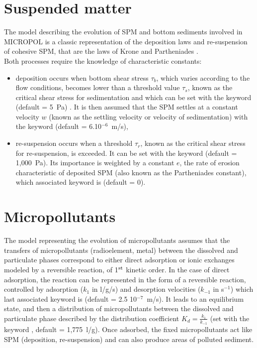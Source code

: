 \section{Suspended matter}

The model describing the evolution of SPM and bottom sediments involved in MICROPOL
is a classic representation of the deposition laws and re-suspension
of cohesive SPM, that are the laws of Krone \cite{krone_flume_1962}
and Partheniades \cite{partheniades_erosion_deposition_1965}.\\

Both processes require the knowledge of characteristic constants:

\begin{itemize}
\item deposition occurs when bottom shear stress $\tau_b$,
  which varies according to the flow conditions, becomes lower than a threshold value $\tau_s$,
  known as the critical shear stress for sedimentation
  and which can be set with the keyword 
  (default = 5~Pa) .
  It is then assumed that the SPM settles at a constant velocity $w$
  (known as the settling velocity or velocity of sedimentation)
  with the keyword 
  (default = 6.10$^{-6}$~m/s),
\item re-suspension occurs when a threshold $\tau_r$,
  known as the critical shear stress for re-suspension, is exceeded.
  It can be set with the keyword 
  (default = 1,000~Pa).
  Its importance is weighted by a constant $e$, the rate of erosion characteristic
  of deposited SPM (also known as the Partheniades constant),
  which associated keyword is  (default = 0).
\end{itemize}

\section{Micropollutants}

The model representing the evolution of micropollutants assumes
that the transfers of micropollutants (radioelement, metal)
between the dissolved and particulate phases correspond to either
direct adsorption or ionic exchanges modeled by a reversible reaction,
of 1$^{\rm{st}}$ kinetic order.
In the case of direct adsorption, the reaction can be represented in the form of
a reversible reaction, controlled by adsorption ($k_1$ in l/g/s)
and desorption velocities ($k_{-1}$ in s$^{-1}$)
which last associated keyword is 
(default = 2.5 10$^{-7}$~m/s).
It leads to an equilibrium state, and then a distribution of micropollutants
between the dissolved and particulate phase described
by the distribution coefficient $K_d = \frac{k_1}{k_{-1}}$
(set with the keyword
, default = 1,775~l/g).
Once adsorbed, the fixed micropollutants act like SPM (deposition, re-suspension)
and can also produce areas of polluted sediment.\\

